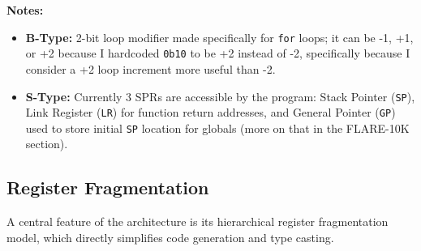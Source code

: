 \documentclass{article}
\begin{document}
\begin{table}[h!]
\centering
\caption{Eclipse-100000 Instruction Formats}
\label{tab:instruction_types}
\end{table}

\noindent \textbf{Notes:}
\begin{itemize}
    \item \textbf{B-Type:} 2-bit loop modifier made specifically for \texttt{for} loops; it can be -1, +1, or +2 because I hardcoded \texttt{0b10} to be +2 instead of -2, specifically because I consider a +2 loop increment more useful than -2. 
    \item \textbf{S-Type:} Currently 3 SPRs are accessible by the program: Stack Pointer (\texttt{SP}), Link Register (\texttt{LR}) for function return addresses, and General Pointer (\texttt{GP}) used to store initial \texttt{SP} location for globals (more on that in the FLARE-10K section). 
\end{itemize}

\subsection{Register Fragmentation}
A central feature of the architecture is its hierarchical register fragmentation model, which directly simplifies code generation and type casting.
\end{document}
